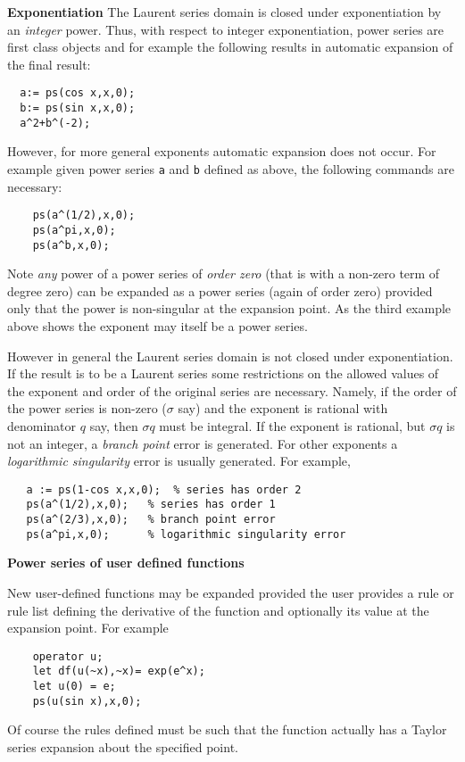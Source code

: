 \textbf{Exponentiation}
The Laurent series domain is closed under exponentiation by an \emph{integer}
power. Thus, with respect to integer exponentiation, power series are first
class objects and for example the following results in automatic expansion of
the final result:
\begin{verbatim}
  a:= ps(cos x,x,0);
  b:= ps(sin x,x,0);
  a^2+b^(-2);
\end{verbatim}

However, for more general exponents automatic expansion does not occur. For
example given power series \texttt{a} and \texttt{b} defined as above, the
following commands are necessary:
\begin{verbatim}
    ps(a^(1/2),x,0);
    ps(a^pi,x,0);
    ps(a^b,x,0);
\end{verbatim}
Note \emph{any} power of a power series of \emph{order zero} (that is with a
non-zero term of degree zero) can be expanded as a power series (again of
order zero) provided only that the power is non-singular at the expansion point.
As the third example above shows the exponent may itself be a power series.

However in general the Laurent series domain is not closed under exponentiation.
If the result is to be a Laurent series some restrictions 
on the allowed values of the exponent and order of the original series are
necessary. Namely, if the order of the power series is non-zero ($\sigma$ say)
and the exponent is rational with denominator $q$ say, then $\sigma q$ must be
integral.  If the exponent is rational, but $\sigma q$ is not an integer,
a \emph{branch point} error is generated. For other exponents a
\emph{logarithmic singularity} error is usually generated. For example,
\begin{verbatim}
   a := ps(1-cos x,x,0);  % series has order 2
   ps(a^(1/2),x,0);   % series has order 1
   ps(a^(2/3),x,0);   % branch point error
   ps(a^pi,x,0);      % logarithmic singularity error
\end{verbatim}

\textbf{Power series of user defined functions}

New user-defined functions may be expanded provided the user provides
a rule or rule list defining the derivative of the function and optionally
its value at the expansion point. For example
\begin{verbatim}
    operator u;
    let df(u(~x),~x)= exp(e^x);
    let u(0) = e;
    ps(u(sin x),x,0);
\end{verbatim}
Of course the rules defined must be such that the function actually has a
Taylor series expansion about the specified point.


